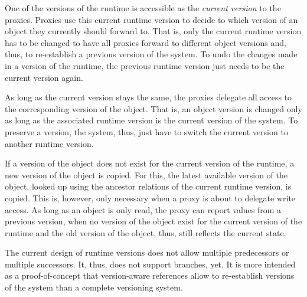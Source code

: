 One of the versions of the runtime is accessible as the \emph{current version} to the proxies.
Proxies use this current runtime version to decide to which version of an object they currently should forward to.
That is, only the current runtime version has to be changed to have all proxies forward to different object versions and, thus, to re-establish a previous version of the system.
To undo the changes made in a version of the runtime, the previous runtime version just needs to be the current version again.

As long as the current version stays the same, the proxies delegate all access to the corresponding version of the object.
That is, an object version is changed only as long as the associated runtime version is the current version of the system.
To preserve a version, the system, thus, just have to switch the current version to another runtime version.

If a version of the object does not exist for the current version of the runtime, a new version of the object is copied.
For this, the latest available version of the object, looked up using the ancestor relations of the current runtime version, is copied.
This is, however, only necessary when a proxy is about to delegate write access.
As long as an object is only read, the proxy can report values from a previous version, when no version of the object exist for the current version of the runtime and the old version of the object, thus, still reflects the current state.

The current design of runtime versions does not allow multiple predecessors or multiple successors.
It, thus, does not support branches, yet.
It is more intended as a proof-of-concept that version-aware references allow to re-establish versions of the system than a complete versioning system.















